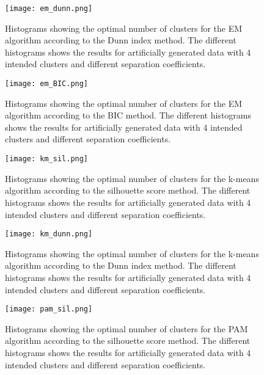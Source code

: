 \documentclass[11pt,twoside,swedish]{article}
\begin{document}
\begin{figure}
\begin{center}
\texttt{[image: em\_dunn.png]}
\caption{Histograms showing the optimal number of clusters for the EM
  algorithm according to the Dunn index method. The different
  histograms shows the results for artificially generated data with 4
  intended clusters and different separation coefficients.}
\label{em_dunn_hists}
\end{center}
\end{figure}

\begin{figure}
\begin{center}
\texttt{[image: em\_BIC.png]}
\caption{Histograms showing the optimal number of clusters for the EM
  algorithm according to the BIC method. The different
  histograms shows the results for artificially generated data with 4
  intended clusters and different separation coefficients.}
\label{em_BIC_hists}
\end{center}
\end{figure}

\begin{figure}
\begin{center}
\texttt{[image: km\_sil.png]}
\caption{Histograms showing the optimal number of clusters for the k-means
  algorithm according to the silhouette score method. The different
  histograms shows the results for artificially generated data with 4
  intended clusters and different separation coefficients.}
\label{km_sil_hists}
\end{center}
\end{figure}

\begin{figure}
\begin{center}
\texttt{[image: km\_dunn.png]}
\caption{Histograms showing the optimal number of clusters for the k-means
  algorithm according to the Dunn index method. The different
  histograms shows the results for artificially generated data with 4
  intended clusters and different separation coefficients.}
\label{km_dunn_hists}
\end{center}
\end{figure}


\begin{figure}
\begin{center}
\texttt{[image: pam\_sil.png]}
\caption{Histograms showing the optimal number of clusters for the PAM
  algorithm according to the silhouette score method. The different
  histograms shows the results for artificially generated data with 4
  intended clusters and different separation coefficients.}
\label{pam_sil_hists}
\end{center}
\end{figure}
\end{document}
